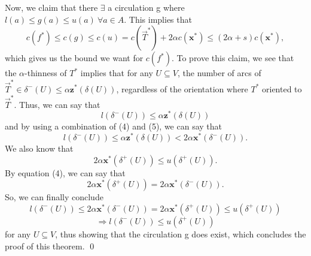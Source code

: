 \documentclass[oneside]{projectpaper} %
\begin{document}
Now, we claim that there $\exists$ a circulation g where $l(a) \leq g(a) \leq u(a) \ \forall a \in A$. This implies that
\begin{equation*}
c(f^*) \leq c(g) \leq c(u) = c(\overrightarrow{T}^*) + 2\alpha c(\textbf{x}^*) \leq (2\alpha + s)c(\textbf{x}^*),
\end{equation*}
which gives us the bound we want for $c(f^*)$. To prove this claim, we see that the $\alpha$-thinness of $T^*$ implies that for any $U \subseteq V$, the number of arcs of $\overrightarrow{T}^*  \in \delta^-(U) \leq \alpha \textbf{z}^*(\delta(U))$, regardless of the orientation where $T^*$ oriented to $\overrightarrow{T}^* $. Thus, we can say that
\begin{equation*}
  l(\delta^-(U)) \leq \alpha \textbf{z}^*(\delta(U))
\end{equation*}
and by using a combination of (4) and (5), we can say that
\begin{equation*}
  l(\delta^-(U)) \leq \alpha \textbf{z}^*(\delta(U)) < 2\alpha \textbf{x}^*(\delta^-(U)).
\end{equation*}
We also know that 
\begin{equation*}
 2\alpha \textbf{x}^*(\delta^+(U)) \leq u(\delta^+(U)). 
\end{equation*}
By equation (4), we can say that 
\begin{equation*}
2\alpha \textbf{x}^*(\delta^+(U)) = 2\alpha \textbf{x}^*(\delta^-(U)).
\end{equation*}
So, we can finally conclude 
\begin{equation*}
  l(\delta^-(U)) \leq 2\alpha \textbf{x}^*(\delta^-(U)) = 2\alpha \textbf{x}^*(\delta^+(U)) \leq u(\delta^+(U))
\end{equation*}
\begin{equation*}
\Rightarrow l(\delta^-(U)) \leq u(\delta^+(U))
\end{equation*}
for any $U \subseteq V$, thus showing that the circulation g does exist, which concludes the proof of this theorem. \hfill\qed
\end{document}
